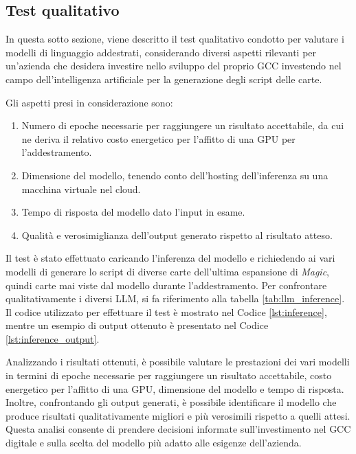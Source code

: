 \subsection{Test qualitativo}\label{sec:hpc_unipr_inference}


In questa sotto sezione, viene descritto il test qualitativo condotto per valutare i modelli di linguaggio addestrati, considerando diversi aspetti rilevanti per un'azienda che desidera investire nello sviluppo del proprio GCC investendo nel campo dell'intelligenza artificiale per la generazione degli script delle carte. 

Gli aspetti presi in considerazione sono:

\begin{enumerate}[label=\alph*.]
    \item Numero di epoche necessarie per raggiungere un risultato accettabile, da cui ne deriva il relativo costo energetico per l'affitto di una GPU per l'addestramento.
    \item Dimensione del modello, tenendo conto dell'hosting dell'inferenza su una macchina virtuale nel cloud.
    \item Tempo di risposta del modello dato l'input in esame.
    \item Qualità e verosimiglianza dell'output generato rispetto al risultato atteso.
\end{enumerate}

Il test è stato effettuato caricando l'inferenza del modello e richiedendo ai vari modelli di generare lo script di diverse carte dell'ultima espansione di \emph{Magic}, quindi carte mai viste dal modello durante l'addestramento. Per confrontare qualitativamente i diversi LLM, si fa riferimento alla tabella \ref{tab:llm_inference}. Il codice utilizzato per effettuare il test è mostrato nel Codice \ref{lst:inference}, mentre un esempio di output ottenuto è presentato nel Codice \ref{lst:inference_output}.

Analizzando i risultati ottenuti, è possibile valutare le prestazioni dei vari modelli in termini di epoche necessarie per raggiungere un risultato accettabile, costo energetico per l'affitto di una GPU, dimensione del modello e tempo di risposta. Inoltre, confrontando gli output generati, è possibile identificare il modello che produce risultati qualitativamente migliori e più verosimili rispetto a quelli attesi. Questa analisi consente di prendere decisioni informate sull'investimento nel GCC digitale e sulla scelta del modello più adatto alle esigenze dell'azienda.


